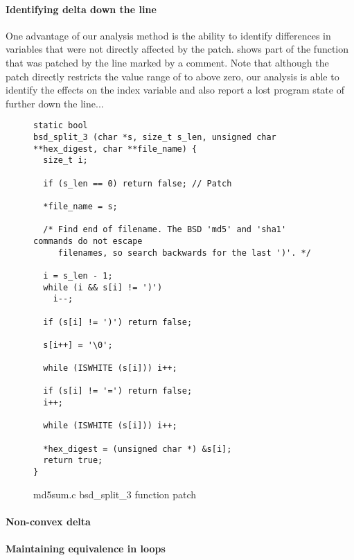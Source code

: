 \paragraph{Identifying delta down the line}
One advantage of our analysis method is the ability to identify differences in variables that were not directly affected by the patch.  shows part of the  function that was patched by the line marked by a comment. Note that although the patch directly restricts the value range of  to above zero, our analysis is able to identify the effects on the index variable  and also report a lost program state of  further down the line...

\begin{figure}[ht]
\centering
\begin{lstlisting}
static bool
bsd_split_3 (char *s, size_t s_len, unsigned char **hex_digest, char **file_name) {
  size_t i;

  if (s_len == 0) return false; // Patch

  *file_name = s;

  /* Find end of filename. The BSD 'md5' and 'sha1' commands do not escape
     filenames, so search backwards for the last ')'. */

  i = s_len - 1;
  while (i && s[i] != ')')
    i--;

  if (s[i] != ')') return false;

  s[i++] = '\0';

  while (ISWHITE (s[i])) i++;

  if (s[i] != '=') return false;
  i++;

  while (ISWHITE (s[i])) i++;

  *hex_digest = (unsigned char *) &s[i];
  return true;
}
\end{lstlisting}
\caption{md5sum.c bsd\_split\_3 function patch}
\end{figure}

\paragraph{Non-convex delta}

\paragraph{Maintaining equivalence in loops}

